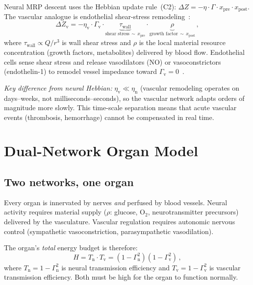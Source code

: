 ﻿\documentclass[aps,pre,twocolumn,superscriptaddress,floatfix]{revtex4-2}
\newcommand{\Gv}{\Gamma_{\mathrm{v}}}
\newcommand{\Gn}{\Gamma_{\mathrm{n}}}
\newcommand{\Tv}{T_{\mathrm{v}}}
\newcommand{\Tn}{T_{\mathrm{n}}}
\newcommand{\Zv}{Z_{\mathrm{v}}}
\begin{document}
Neural MRP descent uses the Hebbian update rule~(C2):
$\Delta Z = -\eta \cdot \Gamma \cdot x_{\text{pre}} \cdot
x_{\text{post}}$.
The vascular analogue is endothelial shear-stress
remodeling~\cite{langille1986,kamiya1984}:
\begin{equation}\label{eq:hebb_v}
  \Delta \Zv = -\eta_{\mathrm{v}} \cdot \Gv
              \cdot \underbrace{\tau_{\text{wall}}}_{\text{shear stress}\,\sim\, x_{\text{pre}}}
              \cdot \underbrace{\rho}_{\text{growth factor}\,\sim\, x_{\text{post}}}\,,
\end{equation}
where $\tau_{\text{wall}} \propto Q/r^3$ is wall shear
stress and $\rho$ is the local material resource
concentration (growth factors, metabolites) delivered
by blood flow.
Endothelial cells sense shear stress and release
vasodilators (NO) or vasoconstrictors (endothelin-1) to
remodel vessel impedance toward $\Gv = 0$~\cite{chiu2011}.

\emph{Key difference from neural Hebbian:}
$\eta_{\mathrm{v}} \ll \eta_{\mathrm{n}}$
(vascular remodeling operates on days--weeks, not
milliseconds--seconds), so the vascular network adapts
orders of magnitude more slowly.
This time-scale separation means that acute vascular
events (thrombosis, hemorrhage) cannot be compensated
in real time.


\section{Dual-Network Organ Model}\label{sec:dual}

\subsection{Two networks, one organ}

Every organ is innervated by nerves \emph{and} perfused
by blood vessels.
Neural activity requires material supply ($\rho$: glucose,
O$_2$, neurotransmitter precursors) delivered by the
vasculature.
Vascular regulation requires autonomic nervous control
(sympathetic vasoconstriction, parasympathetic vasodilation).

The organ's \emph{total} energy budget is therefore:
\begin{equation}\label{eq:dual_health}
  \boxed{H = \Tn \cdot \Tv = (1 - \Gn^2)(1 - \Gv^2)}\,,
\end{equation}
where $\Tn = 1 - \Gn^2$ is neural transmission efficiency
and $\Tv = 1 - \Gv^2$ is vascular transmission efficiency.
Both must be high for the organ to function normally.
\end{document}
